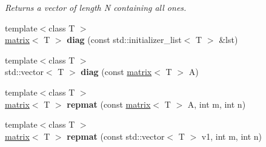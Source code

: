 \begin{DoxyCompactItemize}
\begin{DoxyCompactList}\small\item\em Returns a vector of length N containing all ones. \end{DoxyCompactList}\item 
\hypertarget{namespacekeycpp_a88b11f2372831ebb28fcd2a9961c4eab}{{\footnotesize template$<$class T $>$ }\\\hyperlink{classkeycpp_1_1matrix}{matrix}$<$ T $>$ {\bfseries diag} (const std\-::initializer\-\_\-list$<$ T $>$ \&lst)}\label{namespacekeycpp_a88b11f2372831ebb28fcd2a9961c4eab}

\item 
\hypertarget{namespacekeycpp_a7f7a6d5d46074603720462b96b40d25f}{{\footnotesize template$<$class T $>$ }\\std\-::vector$<$ T $>$ {\bfseries diag} (const \hyperlink{classkeycpp_1_1matrix}{matrix}$<$ T $>$ A)}\label{namespacekeycpp_a7f7a6d5d46074603720462b96b40d25f}

\item 
\hypertarget{namespacekeycpp_a40a637f210b03a3901cafbd6c1a7e83f}{{\footnotesize template$<$class T $>$ }\\\hyperlink{classkeycpp_1_1matrix}{matrix}$<$ T $>$ {\bfseries repmat} (const \hyperlink{classkeycpp_1_1matrix}{matrix}$<$ T $>$ A, int m, int n)}\label{namespacekeycpp_a40a637f210b03a3901cafbd6c1a7e83f}

\item 
\hypertarget{namespacekeycpp_a59fbea40dfc2d43cd338812f06c4f064}{{\footnotesize template$<$class T $>$ }\\\hyperlink{classkeycpp_1_1matrix}{matrix}$<$ T $>$ {\bfseries repmat} (const std\-::vector$<$ T $>$ v1, int m, int n)}\label{namespacekeycpp_a59fbea40dfc2d43cd338812f06c4f064}


\end{DoxyCompactItemize}
